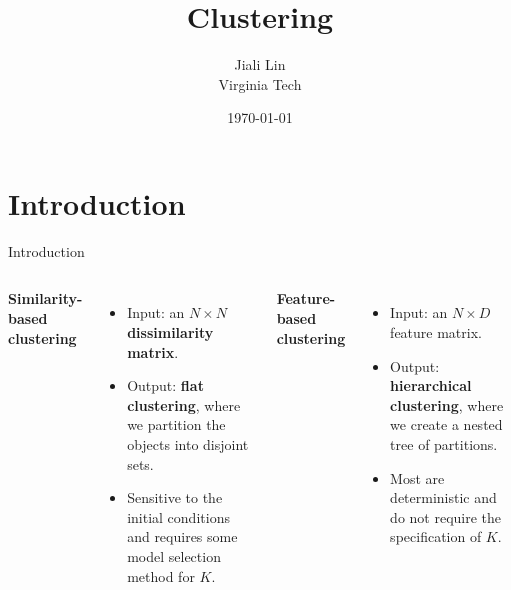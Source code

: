 \documentclass[10pt,mathserif]{beamer}
\title{\large \bfseries Clustering}
\author{Jiali Lin\\[3ex]
Virginia Tech}
\date{\today}
\begin{document}
\frame{
\thispagestyle{empty}
\titlepage
}

\section{Introduction}
\begin{frame}{Introduction}
\begin{columns}
\textbf{Similarity-based clustering} 
\begin{itemize}
    \item Input: an $N\times N$ \textbf{dissimilarity matrix}.
    \item Output: \textbf{flat clustering}, where we partition the objects into disjoint sets.
    \item Sensitive to the initial conditions and requires some model selection method for $K$.
\end{itemize}

\textbf{Feature-based clustering} 
\begin{itemize}
    \item Input: an $N \times D$ feature matrix.
    \item Output: \textbf{hierarchical clustering}, where we create a nested tree of partitions.
    \item Most are deterministic and do not require the specification of $K$.
\end{itemize}
\end{columns}
\end{frame}
\end{document}
